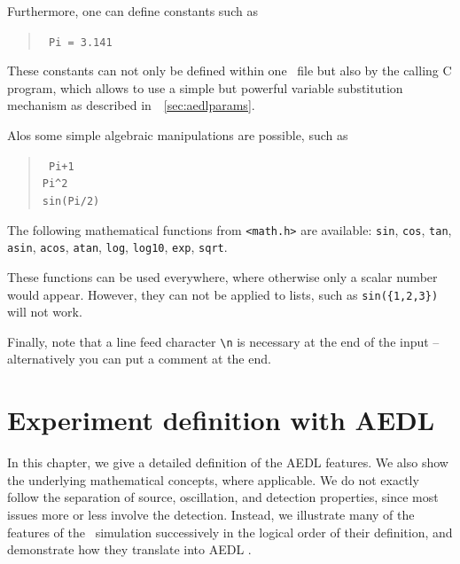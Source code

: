 Furthermore, one can define constants such as
\begin{quote}
{\tt
Pi = 3.141
}
\end{quote}
These constants can not only be defined within one \AEDL\ file but also
by the calling C program, which allows to use a simple but powerful variable
substitution mechanism as described in~\Sec~\ref{sec:aedlparams}.

Alos some simple algebraic manipulations are possible, such as
\begin{quote}
{\tt
Pi+1\\
\verb+Pi^2+\\
sin(Pi/2)\\
}
\end{quote}
The following mathematical functions from {\tt <math.h>} are available: 
{\tt sin}, {\tt cos}, {\tt tan}, {\tt asin}, {\tt acos}, {\tt atan}, 
{\tt log}, {\tt log10}, {\tt exp}, {\tt sqrt}.



 
These functions can be used everywhere, where
otherwise only a scalar number would appear. However, they can not be
applied to lists, such as {\tt sin(\{1,2,3\})} will not work. 

Finally, note that a line feed character \verb+\n+ is necessary at
 the end of the input -- alternatively you can put a comment at the end.


\chapter{Experiment definition with AEDL}

In this chapter, we give a detailed definition of the AEDL features. We also show the underlying mathematical concepts, where applicable. We do not exactly follow the separation of source, oscillation, and detection properties, since most issues more or less involve the detection. Instead,
we illustrate many of the features of the \GLOBES\ simulation successively
in the logical order of their definition, and demonstrate how they translate into AEDL .

